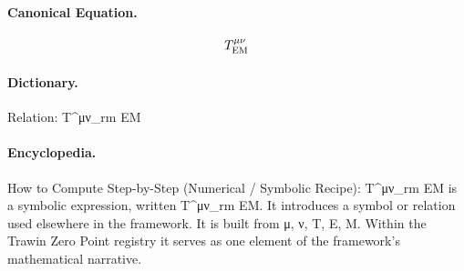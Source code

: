 \paragraph{Canonical Equation.}
\[
T^{\mu\nu}_{\rm EM}
\]

\paragraph{Dictionary.}
Relation: T\textasciicircum{}μν\_rm EM

\paragraph{Encyclopedia.}
How to Compute Step-by-Step (Numerical / Symbolic Recipe): T\textasciicircum{}μν\_rm EM is a symbolic expression, written T\textasciicircum{}μν\_rm EM. It introduces a symbol or relation used elsewhere in the framework. It is built from μ, ν, T, E, M. Within the Trawin Zero Point registry it serves as one element of the framework's mathematical narrative.
